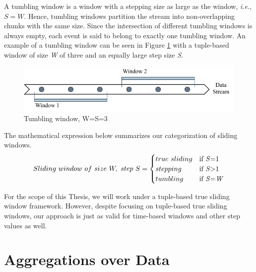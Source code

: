 A tumbling window is a window with a stepping size as large as the window, \textit{i.e.}, $S = W$. Hence, tumbling windows partition the stream into non-overlapping chunks with the same size. Since the intersection of different tumbling windows is always empty, each event is said to belong to exactly one tumbling window. An example of a tumbling window can be seen in Figure \ref{fig:tumbling-window} with a tuple-based window of size \textit{W} of three and an equally large step size \textit{S}.

\begin{figure}[!htb]
    \begin{center}
      \includegraphics[scale=1.1]{figures/tumbling.pdf}
      \caption[Tumbling window]{Tumbling window, W=S=3}
      \label{fig:tumbling-window}
    \end{center}
\end{figure}

The mathematical expression below summarizes our categorization of sliding windows.
\begin{equation} 
\label{math:windows}
  Sliding\ window \,\, of \,\, size \,\, W, \,\, step \,\, S =
    \begin{cases}
      true \,\, sliding & \text{if \textit{S}=1}\\
      stepping & \text{if \textit{S}>1}\\
      tumbling & \text{if \textit{S}=\textit{W}}
    \end{cases}
\end{equation}

For the scope of this Thesis, we will work under a tuple-based true sliding window framework. However, despite focusing on tuple-based true sliding windows, our approach is just as valid for time-based windows and other step values as well.

\section{Aggregations over Data} \label{sec:aggregations}


